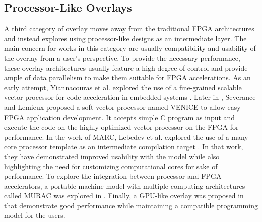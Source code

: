 
\subsection{Processor-Like Overlays}
A third category of overlay moves away from the traditional FPGA architectures and instead explores using processor-like designs as an intermediate layer.
The main concern for works in this category are usually compatibility and usability of the overlay from a user's perspective.  To provide the necessary performance, these overlay architectures usually feature a high degree of control and provide ample of data parallelism to make them suitable for FPGA accelerations.
As an early attempt, Yiannacouras et al. explored the use of a fine-grained scalable vector processor for code acceleration in embedded systems \cite{Yiannacouras2009FPS}.
Later in \cite{Guy2012VENICE}, Severance and Lemieux proposed a soft vector processor named VENICE to allow easy FPGA application development.  It accepts simple C program as input and execute the code on the highly optimized vector processor on the FPGA for performance.
%
%
In the work of MARC, Lebedev et al. explored the use of a many-core processor template as an intermediate compilation target \cite{Lebedev2010}.  In that work, they have demonstrated improved usability with the model while also highlighting the need for customizing computational cores for sake of performance.
To explore the integration between processor and FPGA accelerators, a portable machine model with multiple computing architectures called MURAC was explored in \cite{Hamilton:14:FPL}.
Finally, a GPU-like overlay was proposed in \cite{Jeffrey2011potential} that demonstrate good performance while maintaining a compatible programming model for the users.


